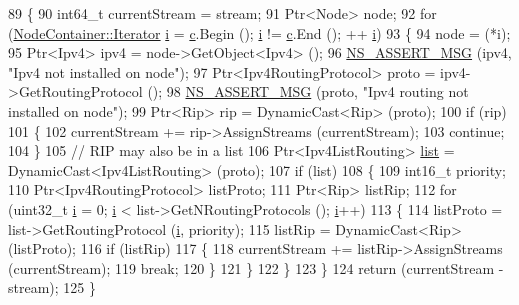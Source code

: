 \begin{DoxyCode}
89 \{
90   int64\_t currentStream = stream;
91   Ptr<Node> node;
92   \textcolor{keywordflow}{for} (\hyperlink{classns3_1_1NodeContainer_aa1a9f2d2b09bfef7d066d3974bca2cc4}{NodeContainer::Iterator} \hyperlink{bernuolliDistribution_8m_a6f6ccfcf58b31cb6412107d9d5281426}{i} = \hyperlink{lte_2model_2fading-traces_2fading__trace__generator_8m_ae0323a9039add2978bf5b49550572c7c}{c}.Begin (); \hyperlink{bernuolliDistribution_8m_a6f6ccfcf58b31cb6412107d9d5281426}{i} != \hyperlink{lte_2model_2fading-traces_2fading__trace__generator_8m_ae0323a9039add2978bf5b49550572c7c}{c}.End (); ++
      \hyperlink{bernuolliDistribution_8m_a6f6ccfcf58b31cb6412107d9d5281426}{i})
93     \{
94       node = (*i);
95       Ptr<Ipv4> ipv4 = node->GetObject<Ipv4> ();
96       \hyperlink{assert_8h_aff5ece9066c74e681e74999856f08539}{NS\_ASSERT\_MSG} (ipv4, \textcolor{stringliteral}{"Ipv4 not installed on node"});
97       Ptr<Ipv4RoutingProtocol> proto = ipv4->GetRoutingProtocol ();
98       \hyperlink{assert_8h_aff5ece9066c74e681e74999856f08539}{NS\_ASSERT\_MSG} (proto, \textcolor{stringliteral}{"Ipv4 routing not installed on node"});
99       Ptr<Rip> rip = DynamicCast<Rip> (proto);
100       \textcolor{keywordflow}{if} (rip)
101         \{
102           currentStream += rip->AssignStreams (currentStream);
103           \textcolor{keywordflow}{continue};
104         \}
105       \textcolor{comment}{// RIP may also be in a list}
106       Ptr<Ipv4ListRouting> \hyperlink{openflow-interface_8h_afd9bcfa176617760671b67580f536fa7}{list} = DynamicCast<Ipv4ListRouting> (proto);
107       \textcolor{keywordflow}{if} (list)
108         \{
109           int16\_t priority;
110           Ptr<Ipv4RoutingProtocol> listProto;
111           Ptr<Rip> listRip;
112           \textcolor{keywordflow}{for} (uint32\_t \hyperlink{bernuolliDistribution_8m_a6f6ccfcf58b31cb6412107d9d5281426}{i} = 0; \hyperlink{bernuolliDistribution_8m_a6f6ccfcf58b31cb6412107d9d5281426}{i} < list->GetNRoutingProtocols (); \hyperlink{bernuolliDistribution_8m_a6f6ccfcf58b31cb6412107d9d5281426}{i}++)
113             \{
114               listProto = list->GetRoutingProtocol (\hyperlink{bernuolliDistribution_8m_a6f6ccfcf58b31cb6412107d9d5281426}{i}, priority);
115               listRip = DynamicCast<Rip> (listProto);
116               \textcolor{keywordflow}{if} (listRip)
117                 \{
118                   currentStream += listRip->AssignStreams (currentStream);
119                   \textcolor{keywordflow}{break};
120                 \}
121             \}
122         \}
123     \}
124   \textcolor{keywordflow}{return} (currentStream - stream);
125 \}
\end{DoxyCode}



